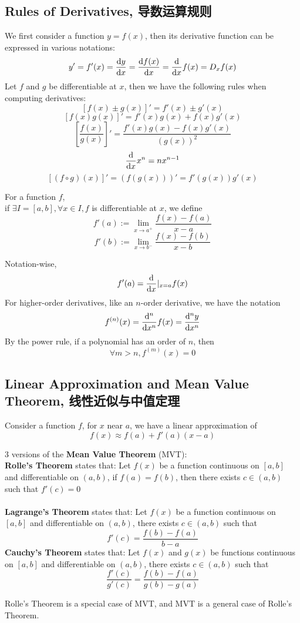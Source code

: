 \subsection{Rules of Derivatives, 导数运算规则}
We first consider a function $y = f(x)$, then its derivative function can be expressed in various notations:
$$y' = f'(x) = \dv{y}{x} = \dv{f(x)}{x} = \dv{x} f(x) = D_xf(x)$$
Let $f$ and $g$ be differentiable at $x$, then we have the following rules when computing derivatives:
$$[f(x) \pm g(x)]' = f'(x) \pm g'(x)$$
$$[f(x)g(x)]' = f'(x)g(x) + f(x)g'(x)$$
$$[\frac{f(x)}{g(x)}]' = \frac{f'(x)g(x)-f(x)g'(x)}{(g(x))^2}$$
$$\dv{x}x^n = nx^{n-1}$$
$$[(f \circ g)(x)]' = (f(g(x)))' = f'(g(x))g'(x)$$
\begin{definition}
    For a function $f$, \\
    if $\exists I = [a, b], \forall x \in I, f$ is differentiable at $x$, we define
    $$f'(a) := \lim_{x \to a^+} \frac{f(x)-f(a)}{x-a}$$
    $$f'(b) := \lim_{x \to b^-} \frac{f(x)-f(b)}{x-b}$$
\end{definition}
Notation-wise,
$$f'(a) = \dv{x}|_{x=a} f(x)$$
For higher-order derivatives, like an $n$-order derivative, we have the notation
$$f^{(n)}(x) = \dv[n]{x}f(x) = \dv[n]{y}{x}$$
By the power rule, if a polynomial has an order of $n$, then
$$\forall m > n, f^{(m)}(x) = 0$$

\subsection{Linear Approximation and Mean Value Theorem, 线性近似与中值定理}
Consider a function $f$, for $x$ near $a$, we have a linear approximation of
$$f(x) \approx f(a) + f'(a)(x-a)$$
\begin{theorem}
    3 versions of the \textbf{Mean Value Theorem} (MVT): \\
    \textbf{Rolle's Theorem} states that: Let $f(x)$ be a function continuous on $[a, b]$ and differentiable on $(a, b)$, if $f(a) = f(b)$, then there exists $c \in (a, b)$ such that $f'(c) = 0$ \\
    \\
    \textbf{Lagrange's Theorem} states that: Let $f(x)$ be a function continuous on $[a, b]$ and differentiable on $(a, b)$, there exists $c \in (a, b)$ such that
    $$f'(c) = \frac{f(b)-f(a)}{b-a}$$
    \textbf{Cauchy's Theorem} states that: Let $f(x)$ and $g(x)$ be functions continuous on $[a, b]$ and differentiable on $(a, b)$, there exists $c \in (a, b)$ such that
    $$\frac{f'(c)}{g'(c)}=\frac{f(b)-f(a)}{g(b)-g(a)}$$
\end{theorem}
Rolle's Theorem is a special case of MVT, and MVT is a general case of Rolle's Theorem.

